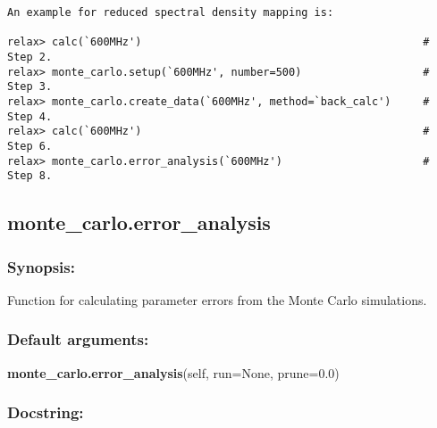 {\begin{verbatim}
An example for reduced spectral density mapping is:

relax> calc(`600MHz')                                            # Step 2.
relax> monte_carlo.setup(`600MHz', number=500)                   # Step 3.
relax> monte_carlo.create_data(`600MHz', method=`back_calc')     # Step 4.
relax> calc(`600MHz')                                            # Step 6.
relax> monte_carlo.error_analysis(`600MHz')                      # Step 8.
\end{verbatim}
}



\newpage

\subsection{monte\_carlo.error\_analysis}


\subsubsection{Synopsis:}

Function for calculating parameter errors from the Monte Carlo simulations.

\subsubsection{Default arguments:}

\textsf{\textbf{monte\_carlo.error\_analysis}(self, run=None, prune=0.0)
}


\subsubsection{Docstring:}

